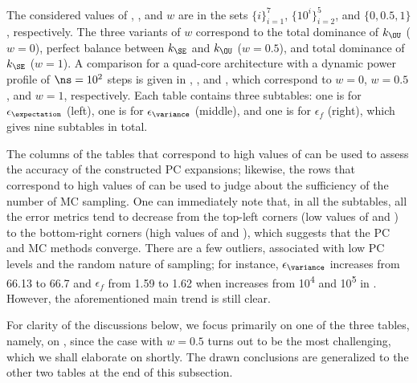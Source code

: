 The considered values of \lc, \no, and $w$ are in the sets $\{ i \}_{i = 1}^7$,
$\{ 10^i \}_{i = 2}^5$, and $\{ 0, 0.5, 1 \}$, respectively. The three variants
of $w$ correspond to the total dominance of $k_\OU$ ($w = 0$), perfect balance
between $k_\SE$ and $k_\OU$ ($w = 0.5$), and total dominance of $k_\SE$ ($w =
1$). A comparison for a quad-core architecture with a dynamic power profile of
$\ns = 10^2$ steps is given in ,
, and , which correspond to $w
= 0$, $w = 0.5$, and $w = 1$, respectively. Each table contains three
subtables: one is for $\epsilon_{\expectation}$ (left), one is for
$\epsilon_{\variance}$ (middle), and one is for $\epsilon_f$ (right), which
gives nine subtables in total.

The columns of the tables that correspond to high values of \no can be used to
assess the accuracy of the constructed \ac{PC} expansions; likewise, the rows
that correspond to high values of \lc can be used to judge about the
sufficiency of the number of \ac{MC} sampling. One can immediately note that,
in all the subtables, all the error metrics tend to decrease from the top-left
corners (low values of \lc and \ns) to the bottom-right corners (high values of
\lc and \ns), which suggests that the \ac{PC} and \ac{MC} methods converge.
There are a few outliers, associated with low \ac{PC} levels and the random
nature of sampling; for instance, $\epsilon_{\variance}$ increases from 66.13 to
66.7 and $\epsilon_f$ from 1.59 to 1.62 when \no increases from
10\textsuperscript{4} and 10\textsuperscript{5} in .
However, the aforementioned main trend is still clear.

For clarity of the discussions below, we focus primarily on one of the three
tables, namely, on , since the case with $w = 0.5$
turns out to be the most challenging, which we shall elaborate on shortly. The
drawn conclusions are generalized to the other two tables at the end of this
subsection.

